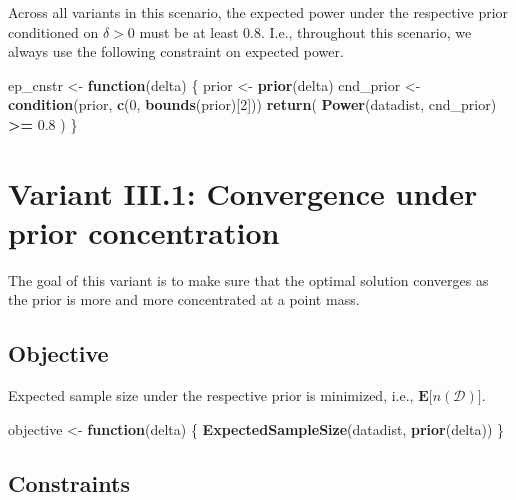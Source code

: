 \documentclass[
]{book}
\newenvironment{Shaded}{\begin{snugshade}}{\end{snugshade}}
\newcommand{\ControlFlowTok}[1]{\textcolor[rgb]{0.13,0.29,0.53}{\textbf{#1}}}
\newcommand{\DecValTok}[1]{\textcolor[rgb]{0.00,0.00,0.81}{#1}}
\newcommand{\FloatTok}[1]{\textcolor[rgb]{0.00,0.00,0.81}{#1}}
\newcommand{\KeywordTok}[1]{\textcolor[rgb]{0.13,0.29,0.53}{\textbf{#1}}}
\newcommand{\NormalTok}[1]{#1}
\newcommand{\OperatorTok}[1]{\textcolor[rgb]{0.81,0.36,0.00}{\textbf{#1}}}
\newcommand{\StringTok}[1]{\textcolor[rgb]{0.31,0.60,0.02}{#1}}
\begin{document}
Across all variants in this scenario, the expected power under the respective
prior conditioned on \(\delta > 0\) must be at least \(0.8\).
I.e., throughout this scenario, we always use the following constraint on
expected power.

\begin{Shaded}
\begin{Highlighting}[]
\NormalTok{ep_cnstr <-}\StringTok{ }\ControlFlowTok{function}\NormalTok{(delta) \{}
\NormalTok{    prior     <-}\StringTok{ }\KeywordTok{prior}\NormalTok{(delta)}
\NormalTok{    cnd_prior <-}\StringTok{ }\KeywordTok{condition}\NormalTok{(prior, }\KeywordTok{c}\NormalTok{(}\DecValTok{0}\NormalTok{, }\KeywordTok{bounds}\NormalTok{(prior)[}\DecValTok{2}\NormalTok{]))}
    \KeywordTok{return}\NormalTok{( }\KeywordTok{Power}\NormalTok{(datadist, cnd_prior) }\OperatorTok{>=}\StringTok{ }\FloatTok{0.8}\NormalTok{ )}
\NormalTok{\}}
\end{Highlighting}
\end{Shaded}

\hypertarget{variantIII_1}{%
\section{Variant III.1: Convergence under prior concentration}\label{variantIII_1}}

The goal of this variant is to make sure that the optimal solution
converges as the prior is more and more concentrated at a point mass.

\hypertarget{objective-6}{%
\subsection{Objective}\label{objective-6}}

Expected sample size under the respective prior is minimized, i.e.,
\(\boldsymbol{E}\big[n(\mathcal{D})\big]\).

\begin{Shaded}
\begin{Highlighting}[]
\NormalTok{objective <-}\StringTok{ }\ControlFlowTok{function}\NormalTok{(delta) \{}
    \KeywordTok{ExpectedSampleSize}\NormalTok{(datadist, }\KeywordTok{prior}\NormalTok{(delta))}
\NormalTok{\}}
\end{Highlighting}
\end{Shaded}

\hypertarget{constraints-6}{%
\subsection{Constraints}\label{constraints-6}}
\end{document}
